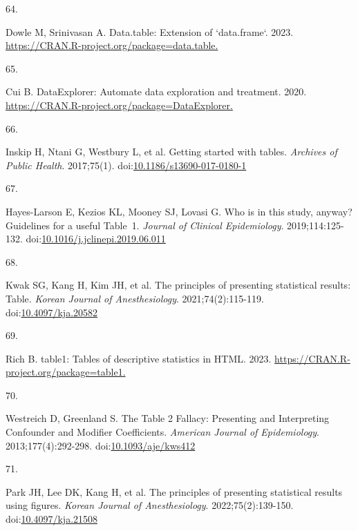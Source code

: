 \documentclass[
]{book}
\newlength{\cslhangindent}
\newlength{\csllabelwidth}
\newlength{\cslentryspacingunit} %
\newenvironment{CSLReferences}[2] %
 {%
  \setlength{\parindent}{0pt}
  \ifodd #1
  \let\oldpar\par
  \def\par{\hangindent=\cslhangindent\oldpar}
  \fi
  \setlength{\parskip}{#2\cslentryspacingunit}
 }%
 {}
\newcommand{\CSLLeftMargin}[1]{\parbox[t]{\csllabelwidth}{#1}}
\newcommand{\CSLRightInline}[1]{\parbox[t]{\linewidth - \csllabelwidth}{#1}\break}
\begin{document}
\begin{CSLReferences}{0}{0}
\leavevmode{}%
\CSLLeftMargin{64. }%
\CSLRightInline{Dowle M, Srinivasan A. Data.table: Extension of `data.frame`. 2023. \href{https://CRAN.R-project.org/package=data.table}{https://CRAN.R-project.org/package=data.table.}}

\leavevmode{}%
\CSLLeftMargin{65. }%
\CSLRightInline{Cui B. DataExplorer: Automate data exploration and treatment. 2020. \href{https://CRAN.R-project.org/package=DataExplorer}{https://CRAN.R-project.org/package=DataExplorer.}}

\leavevmode{}%
\CSLLeftMargin{66. }%
\CSLRightInline{Inskip H, Ntani G, Westbury L, et al. Getting started with tables. \emph{Archives of Public Health}. 2017;75(1). doi:\href{https://doi.org/10.1186/s13690-017-0180-1}{10.1186/s13690-017-0180-1}}

\leavevmode{}%
\CSLLeftMargin{67. }%
\CSLRightInline{Hayes-Larson E, Kezios KL, Mooney SJ, Lovasi G. Who is in this study, anyway? Guidelines for a useful Table~1. \emph{Journal of Clinical Epidemiology}. 2019;114:125-132. doi:\href{https://doi.org/10.1016/j.jclinepi.2019.06.011}{10.1016/j.jclinepi.2019.06.011}}

\leavevmode{}%
\CSLLeftMargin{68. }%
\CSLRightInline{Kwak SG, Kang H, Kim JH, et al. The principles of presenting statistical results: Table. \emph{Korean Journal of Anesthesiology}. 2021;74(2):115-119. doi:\href{https://doi.org/10.4097/kja.20582}{10.4097/kja.20582}}

\leavevmode{}%
\CSLLeftMargin{69. }%
\CSLRightInline{Rich B. table1: Tables of descriptive statistics in HTML. 2023. \href{https://CRAN.R-project.org/package=table1}{https://CRAN.R-project.org/package=table1.}}

\leavevmode{}%
\CSLLeftMargin{70. }%
\CSLRightInline{Westreich D, Greenland S. The Table 2 Fallacy: Presenting and Interpreting Confounder and Modifier Coefficients. \emph{American Journal of Epidemiology}. 2013;177(4):292-298. doi:\href{https://doi.org/10.1093/aje/kws412}{10.1093/aje/kws412}}

\leavevmode{}%
\CSLLeftMargin{71. }%
\CSLRightInline{Park JH, Lee DK, Kang H, et al. The principles of presenting statistical results using figures. \emph{Korean Journal of Anesthesiology}. 2022;75(2):139-150. doi:\href{https://doi.org/10.4097/kja.21508}{10.4097/kja.21508}}


\end{CSLReferences}
\end{document}
